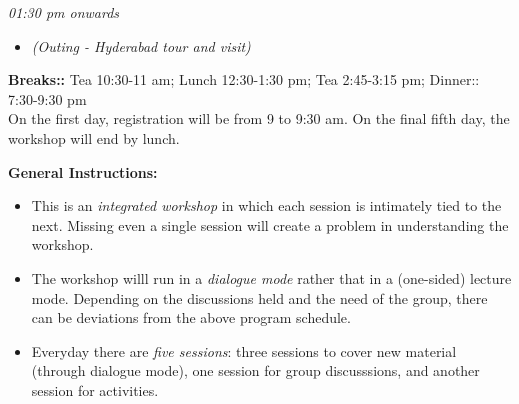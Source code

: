 \documentclass[11pt]{article}
\begin{document}

    \vspace{6mm}
    \noindent
    {\Large\it 01:30 pm onwards}  %
    \begin{itemize}
        \item[] {\em (Outing - Hyderabad tour and visit)}
    \end{itemize}

    \vspace{6mm}
    \noindent
    {\bf Breaks::} Tea 10:30-11 am; Lunch 12:30-1:30 pm; Tea 2:45-3:15 pm;
    Dinner:: 7:30-9:30 pm\\
    On the first day, registration will be from 9 to 9:30 am.
    On the final fifth day, the workshop will end by lunch.

    \vspace{6mm}
    \noindent
    {\bf General Instructions:}
    \begin{itemize}
        \item This is an {\em integrated workshop} in which each session is intimately tied to the next. Missing
        even a single session will create a problem in understanding the workshop.

        \item The workshop willl run in a {\em dialogue mode} rather that in a (one-sided) lecture mode. Depending
        on the discussions held and the need of the group, there can be deviations from the above program schedule.

        \item Everyday there are {\em five sessions}: three sessions to cover new material (through dialogue mode),
        one session for group discusssions, and another session for activities.

    \end{itemize}
\end{document}
